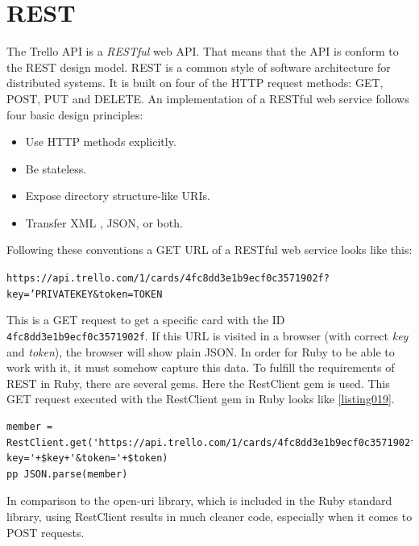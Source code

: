 \section{REST}
The Trello API is a \emph{RESTful} web API. That means that the API is conform to the REST design model. REST is a common style of software architecture for distributed systems. It is built on four of the HTTP request methods: GET, POST, PUT and DELETE. An implementation of a RESTful web service follows four basic design principles:
\begin{itemize}
	\item Use HTTP methods explicitly.
	\item Be stateless.
	\item Expose directory structure-like URIs.
	\item Transfer XML , JSON, or both.
\end{itemize}
\cite{rest}

Following these conventions a GET URL of a RESTful web service looks like this:
\begin{center}
\texttt{https://api.trello.com/1/cards/4fc8dd3e1b9ecf0c3571902f? key='PRIVATEKEY\&token=TOKEN}
\end{center}
This is a GET request to get a specific card with the ID \texttt{4fc8dd3e1b9ecf0c3571902f}. If this URL is visited in a browser (with correct \emph{key} and \emph{token}), the browser will show plain JSON. In order for Ruby to be able to work with it, it must somehow capture this data. To fulfill the requirements of REST in Ruby, there are several gems. Here the RestClient gem is used. This GET request executed with the RestClient gem in Ruby looks like \ref{listing019}.

\begin{lstlisting}[aboveskip=1\baselineskip, caption=GET request using RestClient., label=listing019]
member = RestClient.get('https://api.trello.com/1/cards/4fc8dd3e1b9ecf0c3571902f?key='+$key+'&token='+$token)
pp JSON.parse(member)
\end{lstlisting}

In comparison to the open-uri library, which is included in the Ruby standard library, using RestClient results in much cleaner code, especially when it comes to POST requests.

